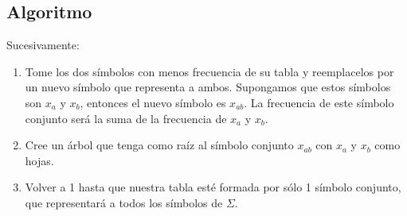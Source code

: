 \documentclass[english, spanish, fleqn, 10pt]{article}
\numberwithin{equation}{section}
\theoremstyle{definition}
\begin{document}
\subsection{Algoritmo}
Sucesivamente:
\begin{enumerate}
	\item Tome los dos símbolos con menos frecuencia de su tabla y reemplacelos por un nuevo símbolo que representa a ambos. Supongamos que estos símbolos son $x_a$ y $x_b$, entonces el nuevo símbolo es $x_{ab}$. La frecuencia de este símbolo conjunto será la suma de la frecuencia de $x_a$ y $x_b$.
	
	\item Cree un árbol que tenga como raíz al símbolo conjunto $x_{ab}$ con $x_{a}$ y $x_{b}$ como hojas.
	
	\item Volver a 1 hasta que nuestra tabla esté formada por sólo 1 símbolo conjunto, que representará a todos los símbolos de $\Sigma$.
\end{enumerate}
\end{document}
